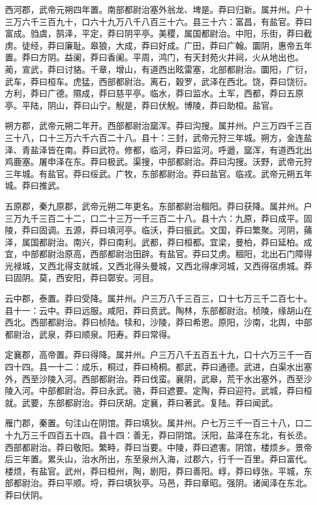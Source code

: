 \documentclass[12pt,UTF8]{ctexbook}
\begin{document}
西河郡，武帝元朔四年置。南部都尉治塞外翁龙、埤是。莽曰归新。属并州。户十三万六千三百九十，口六十九万八千八百三十六。县三十六：富昌，有盐官。莽曰富成。驺虞，鹄泽，平定，莽曰阴平亭。美稷，属国都尉治。中阳，乐街，莽曰截虏。徒经，莽曰廉耻。皋狼，大成，莽曰好成。广田，莽曰广翰。圜阴，惠帝五年置。莽曰方阴。益阑，莽曰香阑。平周，鸿门，有天封苑火井祠，火从地出也。蔺，宣武，莽曰讨貉。千章，增山，有道西出眩雷塞，北部都尉治。圜阳，广衍，武车，莽曰桓车。虎猛，西部都尉治。离石，穀罗，武泽在西北。饶，莽曰饶衍。方利，莽曰广德。隰成，莽曰慈平亭。临水，莽曰监水。土军，西都，莽曰五原亭。平陆，阴山，莽曰山宁。觬是，莽曰伏觬。博陵，莽曰助桓。盐官。



朔方郡，武帝元朔二年开。西部都尉治窳浑。莽曰沟搜。属并州。户三万四千三百三十八，口十三万六千六百二十八。县十：三封，武帝元狩三年城。朔方，金连盐泽、青盐泽皆在南。莽曰武符。修都，临河，莽曰监河。呼遒，窳浑，有道西北出鸡鹿塞。屠申泽在东。莽曰极武。渠搜，中部都尉治。莽曰沟搜。沃野，武帝元狩三年城。有盐官。莽曰绥武。广牧，东部都尉治。莽曰盐官。临戎。武帝元朔五年城。莽曰推武。



五原郡，秦九原郡，武帝元朔二年更名。东部都尉治稒阳。莽曰获降。属并州。户三万九千三百二十二，口二十三万一千三百二十八。县十六：九原，莽曰成平。固陵，莽曰固调。五源，莽曰填河亭。临沃，莽曰振武。文国，莽曰繁聚。河阴，蒱泽，属国都尉治。南兴，莽曰南利。武都，莽曰桓都。宜梁，曼柏，莽曰延柏。成宜，中部都尉治原高，西部都尉治田辟。有盐官。莽曰艾虏。稒阳，北出石门障得光禄城，又西北得支就城，又西北得头曼城，又西北得虖河城，又西得宿虏城。莽曰固阴。莫，西安阳，莽曰鄣安。河目。



云中郡，泰置。莽曰受降。属并州。户三万八千三百三，口十七万三千二百七十。县十一：云中。莽曰远服。咸阳，莽曰贲武。陶林，东部都尉治。桢陵，缘胡山在西北。西部都尉治。莽曰桢陆。犊和，沙陵，莽曰希恩。原阳，沙南，北舆，中部都尉治，武泉，莽曰顺泉。阳寿。莽曰常得。



定襄郡，高帝置。莽曰得降。属并州。户三万八千五百五十九，口十六万三千一百四十四。县一十二：成乐，桐过，莽曰椅桐。都武，莽曰通德。武进，白渠水出塞外，西至沙陵入河。西部都尉治。莽曰伐蛮。襄阴，武皋，荒干水出塞外，西至沙陵入河。中部都尉治。莽曰永武。骆，莽曰遮要。定陶，莽曰迎符。武城，莽曰桓就。武要，东部都尉治。莽曰厌胡。定襄，莽曰著武。复陆。莽曰闻武。



雁门郡，秦置。句注山在阴馆。莽曰填狄。属并州。户七万三千一百三十八，口二十九万三千四百五十四。县十四：善无，莽曰阴馆。沃阳，盐泽在东北，有长丞。西部都尉治。莽曰敬阳。繁畤，莽曰当要。中陵，莽曰遮害。阴馆，楼烦乡。景帝后三年置。累头山，治水所出，东至泉州入海，过郡六，行千一百里。莽曰富代。楼烦，有盐官。武州，莽曰桓州，陶，剧阳，莽曰善阳。崞，莽曰崞张。平城，东部都尉治。莽曰平顺。埒，莽曰填狄亭。马邑，莽曰章昭。强阴。诸闻泽在东北。莽曰伏阴。
\end{document}
